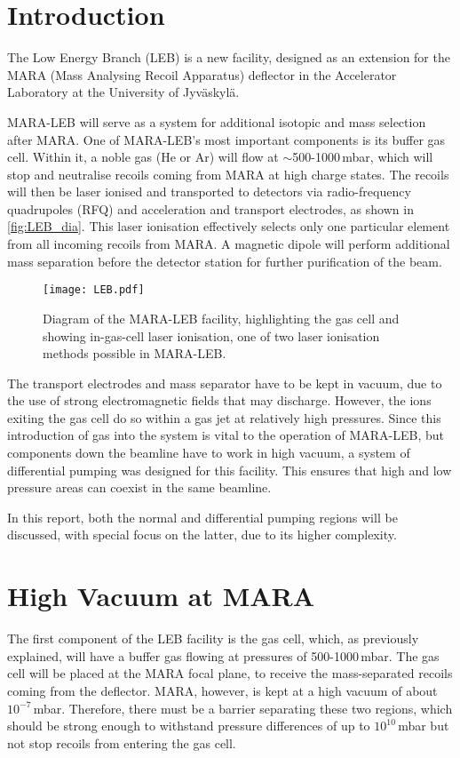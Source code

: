 





\section{Introduction}
\label{sec:intro}
The Low Energy Branch (LEB) is a new facility, designed as an extension for the MARA (Mass Analysing Recoil Apparatus) deflector in the Accelerator Laboratory at the University of Jyväskylä.

MARA-LEB will serve as a system for additional isotopic and mass selection after MARA. One of MARA-LEB's most important components is its buffer gas cell. Within it, a noble gas (He or Ar) will flow at $\sim$500-1000\,mbar, which will stop and neutralise recoils coming from MARA at high charge states. The recoils will then be laser ionised and transported to detectors via radio-frequency quadrupoles (RFQ) and acceleration and transport electrodes, as shown in \autoref{fig:LEB_dia}. This laser ionisation effectively selects only one particular element from all incoming recoils from MARA. A magnetic dipole will perform additional mass separation before the detector station for further purification of the beam.

\begin{figure}[H]
    \centering
    \texttt{[image: LEB.pdf]}    
    \caption[The MARA-LEB facility]{Diagram of the MARA-LEB facility, highlighting the gas cell and showing in-gas-cell laser ionisation, one of two laser ionisation methods possible in MARA-LEB.}
    \label{fig:LEB_dia}
\end{figure}

The transport electrodes and mass separator have to be kept in vacuum, due to the use of strong electromagnetic fields that may discharge. However, the ions exiting the gas cell do so within a gas jet at relatively high pressures. Since this introduction of gas into the system is vital to the operation of MARA-LEB, but components down the beamline have to work in high vacuum, a system of {differential pumping} was designed for this facility. This ensures that high and low pressure areas can coexist in the same beamline. 

In this report, both the normal and differential pumping regions will be discussed, with special focus on the latter, due to its higher complexity. 
\newpage

\section{High Vacuum at MARA}
\label{sec:mara}
The first component of the LEB facility is the gas cell, which, as previously explained, will have a buffer gas flowing at pressures of 500-1000\,mbar. The gas cell will be placed at the MARA focal plane, to receive the mass-separated recoils coming from the deflector. MARA, however, is kept at a high vacuum of about $10^{-7}$\,mbar. Therefore, there must be a barrier separating these two regions, which should be strong enough to withstand pressure differences of up to  $10^{10}$\,mbar but not stop recoils from entering the gas cell.

